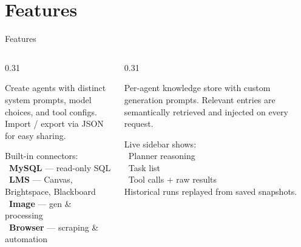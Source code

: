 \documentclass[aspectratio=169, 10pt]{beamer}
\begin{document}
\section{Features}

\begin{frame}{Features}
  \begin{columns}[T]
    \begin{column}{0.31\textwidth}
      \begin{tcolorbox}[featurebox, title={\faRobot\ \ Agent Management}]
        \scriptsize
        Create agents with distinct system prompts, model choices, and tool
        configs.\\[4pt]
        Import / export via JSON for easy sharing.
      \end{tcolorbox}\vspace{0.4em}

      \begin{tcolorbox}[featurebox, title={\faTools\ \ MCP Tool Execution}]
        \scriptsize
        Built-in connectors:\\[2pt]
        \textbullet\ \textbf{MySQL} — read-only SQL\\
        \textbullet\ \textbf{LMS} — Canvas, Brightspace, Blackboard\\
        \textbullet\ \textbf{Image} — gen \& processing\\
        \textbullet\ \textbf{Browser} — scraping \& automation
      \end{tcolorbox}
    \end{column}

    \begin{column}{0.31\textwidth}
      \begin{tcolorbox}[featurebox, title={\faBook\ \ Knowledge Management}]
        \scriptsize
        Per-agent knowledge store with custom generation prompts.
        Relevant entries are semantically retrieved and injected on every
        request.
      \end{tcolorbox}\vspace{0.4em}

      \begin{tcolorbox}[featurebox, title={\faChartBar\ \ Observability}]
        \scriptsize
        Live sidebar shows:\\[2pt]
        \textbullet\ Planner reasoning\\
        \textbullet\ Task list\\
        \textbullet\ Tool calls + raw results\\[4pt]
        Historical runs replayed from saved snapshots.
      \end{tcolorbox}
    \end{column}


\end{columns}
\end{frame}
\end{document}
